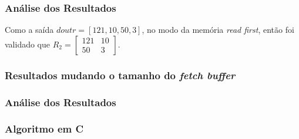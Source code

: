 \documentclass{beamer}
\begin{document}
    \begin{frame}
        \frametitle{Análise dos Resultados}

        \begingroup
            Como a saída $ doutr = [121, 10, 50, 3] $, 
            no modo da memória \textit{read first}, então
            foi validado que $ R_2 = \begin{bmatrix} 121 & 10 \\ 50 & 3 \end{bmatrix} $.
        \endgroup

        \begin{figure}[h]
            \centering
          \end{figure}
    \end{frame}

    \begin{frame}[fragile]
        \frametitle{Resultados mudando o tamanho do \textit{fetch buffer}}



    \end{frame}

    \begin{frame}
        \frametitle{Análise dos Resultados}

        

    \end{frame}


    \begin{frame}[fragile]
        \frametitle{Algoritmo em C}

    \end{frame}
\end{document}
